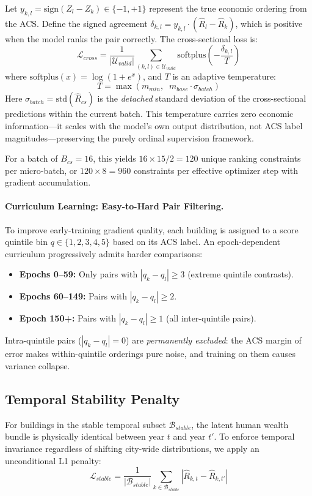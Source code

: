 \documentclass[12pt]{article}
\begin{document}
Let $y_{k,l} = \text{sign}(Z_l - Z_k) \in \{-1, +1\}$ represent the true economic ordering from the ACS. Define the signed agreement $\delta_{k,l} = y_{k,l} \cdot (\hat{R}_l - \hat{R}_k)$, which is positive when the model ranks the pair correctly. The cross-sectional loss is:
\begin{equation}
\mathcal{L}_{cross} = \frac{1}{|\mathcal{U}_{valid}|} \sum_{(k,l) \in \mathcal{U}_{valid}} \text{softplus}\!\left(-\frac{\delta_{k,l}}{T}\right)
\end{equation}
where $\text{softplus}(x) = \log(1 + e^x)$, and $T$ is an adaptive temperature:
\begin{equation}
T = \max\!\left(m_{min},\;\; m_{base} \cdot \sigma_{batch}\right)
\end{equation}
Here $\sigma_{batch} = \text{std}(\hat{R}_{cs})$ is the \textit{detached} standard deviation of the cross-sectional predictions within the current batch. This temperature carries zero economic information—it scales with the model's own output distribution, not ACS label magnitudes—preserving the purely ordinal supervision framework.

For a batch of $B_{cs} = 16$, this yields $16 \times 15 / 2 = 120$ unique ranking constraints per micro-batch, or $120 \times 8 = 960$ constraints per effective optimizer step with gradient accumulation.

\paragraph{Curriculum Learning: Easy-to-Hard Pair Filtering.}
To improve early-training gradient quality, each building is assigned to a score quintile bin $q \in \{1, 2, 3, 4, 5\}$ based on its ACS label. An epoch-dependent curriculum progressively admits harder comparisons:
\begin{itemize}
    \item \textbf{Epochs 0--59:} Only pairs with $|q_k - q_l| \geq 3$ (extreme quintile contrasts).
    \item \textbf{Epochs 60--149:} Pairs with $|q_k - q_l| \geq 2$.
    \item \textbf{Epoch 150+:} Pairs with $|q_k - q_l| \geq 1$ (all inter-quintile pairs).
\end{itemize}
Intra-quintile pairs ($|q_k - q_l| = 0$) are \textit{permanently excluded}: the ACS margin of error makes within-quintile orderings pure noise, and training on them causes variance collapse.

\subsection{Temporal Stability Penalty}
For buildings in the stable temporal subset $\mathcal{B}_{stable}$, the latent human wealth bundle is physically identical between year $t$ and year $t'$. To enforce temporal invariance regardless of shifting city-wide distributions, we apply an unconditional L1 penalty:
\begin{equation}
\mathcal{L}_{stable} = \frac{1}{|\mathcal{B}_{stable}|} \sum_{k \in \mathcal{B}_{stable}} \left| \hat{R}_{k,t} - \hat{R}_{k,t'} \right|
\end{equation}
\end{document}
